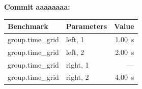 
\noindent
\textbf{Commit aaaaaaaa:}

\begin{tabular}{llr}
\toprule
Benchmark & Parameters & Value \\
\midrule
group.time\_grid & left, 1 & \qty{1.00}{\second} \\
group.time\_grid & left, 2 & \qty{2.00}{\second} \\
group.time\_grid & right, 1 & --- \\
group.time\_grid & right, 2 & \qty{4.00}{\second} \\
\bottomrule
\end{tabular}
